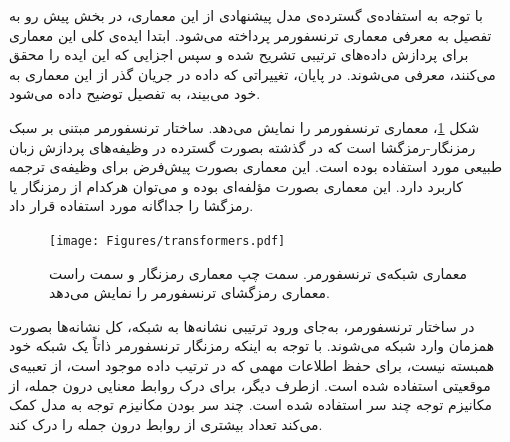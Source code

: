  
با توجه به استفاده‌ی گسترده‌ی مدل پیشنهادی از این معماری، در بخش پیش رو به تفصیل به معرفی معماری ترنسفورمر پرداخته می‌شود. ابتدا ایده‌ی کلی این معماری برای پردازش داده‌های ترتیبی تشریح شده و سپس اجزایی که این ایده را محقق می‌کنند، معرفی می‌شوند. در پایان، تغییراتی که داده در جریان گذر از این معماری به خود می‌بیند، به تفصیل توضیح داده می‌شود.


شکل \ref{Fig:Transformers}، معماری ترنسفورمر را نمایش می‌دهد. ساختار ترنسفورمر مبتنی بر سبک رمزنگار-رمزگشا است که در گذشته بصورت گسترده در وظیفه‌های پردازش زبان طبیعی مورد استفاده بوده است. این معماری بصورت پیش‌فرض برای وظیفه‌ی ترجمه کاربرد دارد. این معماری بصورت مؤلفه‌ای بوده و می‌توان هرکدام از رمزنگار یا رمزگشا را جداگانه مورد استفاده قرار داد.
 \begin{figure}[!htb]
	\centering
	\texttt{[image: Figures/transformers.pdf]}
	\caption[معماری شبکه‌ی ترنسفورمر]{معماری شبکه‌ی ترنسفورمر. سمت چپ معماری رمزنگار و سمت راست معماری رمزگشای ترنسفورمر را نمایش می‌دهد.}
	\label{Fig:Transformers}
\end{figure}
در ساختار ترنسفورمر، به‌جای ورود ترتیبی نشانه‌ها به شبکه، کل نشانه‌ها بصورت همزمان وارد شبکه می‌شوند. با توجه به اینکه رمزنگار ترنسفورمر ذاتاً یک شبکه خود همبسته نیست، برای حفظ اطلاعات مهمی که در ترتیب داده موجود است، از تعبیه‌ی موقعیتی استفاده شده است. ازطرف دیگر، برای درک روابط معنایی درون جمله، از مکانیزم توجه چند سر استفاده شده است. چند سر بودن مکانیزم توجه به مدل کمک می‌کند تعداد بیشتری از روابط درون جمله را درک کند.
